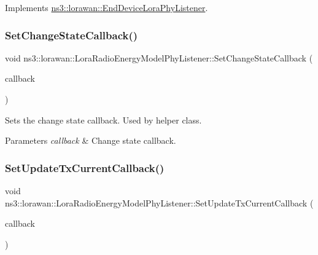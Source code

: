 Implements \hyperlink{classns3_1_1lorawan_1_1EndDeviceLoraPhyListener_abf3943484dc182ade9f180cd806d43f4}{ns3\+::lorawan\+::\+End\+Device\+Lora\+Phy\+Listener}.

\mbox{\label{classns3_1_1lorawan_1_1LoraRadioEnergyModelPhyListener_a6a2e034f5e7b492b952a1ae213d572e3}} 
\subsubsection{\texorpdfstring{Set\+Change\+State\+Callback()}{SetChangeStateCallback()}}
{\footnotesize\ttfamily void ns3\+::lorawan\+::\+Lora\+Radio\+Energy\+Model\+Phy\+Listener\+::\+Set\+Change\+State\+Callback (\begin{DoxyParamCaption}\item[{Device\+Energy\+Model\+::\+Change\+State\+Callback}]{callback }\end{DoxyParamCaption})}



Sets the change state callback. Used by helper class. 


\begin{DoxyParams}{Parameters}
{\em callback} & Change state callback. \\
\hline
\end{DoxyParams}
\mbox{\label{classns3_1_1lorawan_1_1LoraRadioEnergyModelPhyListener_a6f15e4406f51936ba7c8b8cb03284334}} 
\subsubsection{\texorpdfstring{Set\+Update\+Tx\+Current\+Callback()}{SetUpdateTxCurrentCallback()}}
{\footnotesize\ttfamily void ns3\+::lorawan\+::\+Lora\+Radio\+Energy\+Model\+Phy\+Listener\+::\+Set\+Update\+Tx\+Current\+Callback (\begin{DoxyParamCaption}\item[{\hyperlink{classns3_1_1lorawan_1_1LoraRadioEnergyModelPhyListener_a6e0dbc535ae92d41bf4699ca6d97d229}{Update\+Tx\+Current\+Callback}}]{callback }\end{DoxyParamCaption})}



